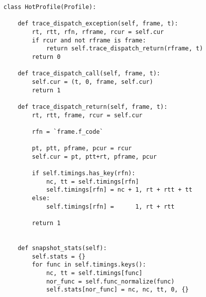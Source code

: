\begin{verbatim}
class HotProfile(Profile):

    def trace_dispatch_exception(self, frame, t):
        rt, rtt, rfn, rframe, rcur = self.cur
        if rcur and not rframe is frame:
            return self.trace_dispatch_return(rframe, t)
        return 0

    def trace_dispatch_call(self, frame, t):
        self.cur = (t, 0, frame, self.cur)
        return 1

    def trace_dispatch_return(self, frame, t):
        rt, rtt, frame, rcur = self.cur

        rfn = `frame.f_code`

        pt, ptt, pframe, pcur = rcur
        self.cur = pt, ptt+rt, pframe, pcur

        if self.timings.has_key(rfn):
            nc, tt = self.timings[rfn]
            self.timings[rfn] = nc + 1, rt + rtt + tt
        else:
            self.timings[rfn] =      1, rt + rtt

        return 1


    def snapshot_stats(self):
        self.stats = {}
        for func in self.timings.keys():
            nc, tt = self.timings[func]
            nor_func = self.func_normalize(func)
            self.stats[nor_func] = nc, nc, tt, 0, {}
\end{verbatim}
